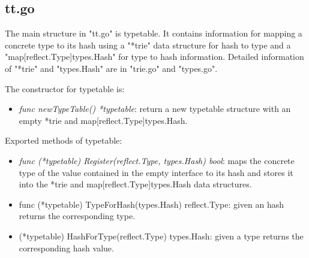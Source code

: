 \subsection{tt.go} 

The main structure in "tt.go" is typetable. It contains information for mapping a concrete type to its hash using a "*trie" data structure for hash to type and a "map[reflect.Type]types.Hash" for type to hash information. Detailed information of "*trie" and "types.Hash" are in "trie.go" and "types.go".

The constructor for typetable is:

\begin{itemize}

	\item \emph{func newTypeTable() *typetable}: return a new typetable structure with an empty *trie and map[reflect.Type]types.Hash.
	
\end{itemize}

Exported methods of typetable:

\begin{itemize}
	\item \emph{func (*typetable) Register(reflect.Type, types.Hash) bool}: maps the concrete type of the value contained in the empty interface to its hash and stores it into the *trie and map[reflect.Type]types.Hash data structures.
	\item func (*typetable) TypeForHash(types.Hash) reflect.Type: given an hash returns the corresponding type.
	\item (*typetable) HashForType(reflect.Type) types.Hash: given a type returns the corresponding hash value.
\end{itemize}

